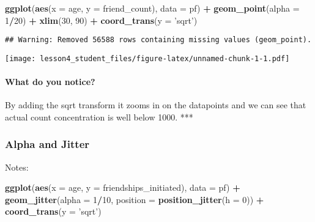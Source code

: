 \documentclass[]{article}
\newenvironment{Shaded}{\begin{snugshade}}{\end{snugshade}}
\newcommand{\KeywordTok}[1]{\textcolor[rgb]{0.13,0.29,0.53}{\textbf{#1}}}
\newcommand{\DataTypeTok}[1]{\textcolor[rgb]{0.13,0.29,0.53}{#1}}
\newcommand{\DecValTok}[1]{\textcolor[rgb]{0.00,0.00,0.81}{#1}}
\newcommand{\StringTok}[1]{\textcolor[rgb]{0.31,0.60,0.02}{#1}}
\newcommand{\OperatorTok}[1]{\textcolor[rgb]{0.81,0.36,0.00}{\textbf{#1}}}
\newcommand{\NormalTok}[1]{#1}
\let\oldparagraph\paragraph
\renewcommand{\paragraph}[1]{\oldparagraph{#1}\mbox{}}
\begin{document}
\begin{Shaded}
\begin{Highlighting}[]
\KeywordTok{ggplot}\NormalTok{(}\KeywordTok{aes}\NormalTok{(}\DataTypeTok{x =}\NormalTok{ age, }\DataTypeTok{y =}\NormalTok{ friend_count), }\DataTypeTok{data =}\NormalTok{ pf) }\OperatorTok{+}
\StringTok{  }\KeywordTok{geom_point}\NormalTok{(}\DataTypeTok{alpha =} \DecValTok{1}\OperatorTok{/}\DecValTok{20}\NormalTok{) }\OperatorTok{+}\StringTok{ }
\StringTok{  }\KeywordTok{xlim}\NormalTok{(}\DecValTok{30}\NormalTok{, }\DecValTok{90}\NormalTok{) }\OperatorTok{+}
\StringTok{  }\KeywordTok{coord_trans}\NormalTok{(}\DataTypeTok{y =} \StringTok{'sqrt'}\NormalTok{)}
\end{Highlighting}
\end{Shaded}

\begin{verbatim}
## Warning: Removed 56588 rows containing missing values (geom_point).
\end{verbatim}

\texttt{[image: lesson4\_student\_files/figure-latex/unnamed-chunk-1-1.pdf]}

\paragraph{What do you notice?}\label{what-do-you-notice}

By adding the sqrt transform it zooms in on the datapoints and we can
see that actual count concentration is well below 1000. ***

\subsubsection{Alpha and Jitter}\label{alpha-and-jitter}

Notes:

\begin{Shaded}
\begin{Highlighting}[]
\KeywordTok{ggplot}\NormalTok{(}\KeywordTok{aes}\NormalTok{(}\DataTypeTok{x =}\NormalTok{ age, }\DataTypeTok{y =}\NormalTok{ friendships_initiated), }\DataTypeTok{data =}\NormalTok{ pf) }\OperatorTok{+}\StringTok{ }
\StringTok{  }\KeywordTok{geom_jitter}\NormalTok{(}\DataTypeTok{alpha =} \DecValTok{1}\OperatorTok{/}\DecValTok{10}\NormalTok{, }\DataTypeTok{position =} \KeywordTok{position_jitter}\NormalTok{(}\DataTypeTok{h =} \DecValTok{0}\NormalTok{)) }\OperatorTok{+}
\StringTok{  }\KeywordTok{coord_trans}\NormalTok{(}\DataTypeTok{y =} \StringTok{'sqrt'}\NormalTok{)}
\end{Highlighting}
\end{Shaded}
\end{document}
